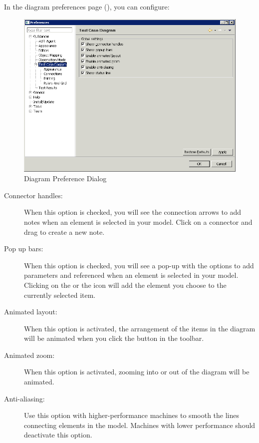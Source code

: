 
In the \gdcase{} diagram preferences page (), you can configure:

\begin{figure}[h]
\begin{center}
\includegraphics[width=12.5cm]{Tasks/Preferences/PS/diagramprefs}
\caption{Diagram Preference Dialog}
\label{diagramprefs}
\end{center}
\end{figure}

\begin{description}
\item [Connector handles:]{When this option is checked, you will see the connection arrows to add notes when an element is selected in your model. Click on a connector and drag to create a new note.}
\item [Pop up bars:]{When this option is checked, you will see a pop-up with the options to add parameters and \gdcase{} referenced when an element is selected in your model. Clicking on the  or the  icon will add the element you choose to the currently selected item. }
\item [Animated layout:]{When this option is activated, the arrangement of the items in the diagram will be animated when you click the  button in the toolbar. }
\item [Animated zoom:]{When this option is activated, zooming into or out of the diagram will be animated. }
\item [Anti-aliasing:]{Use this option with higher-performance machines to smooth the lines connecting elements in the model. Machines with lower performance should deactivate this option. }
\end{description}

